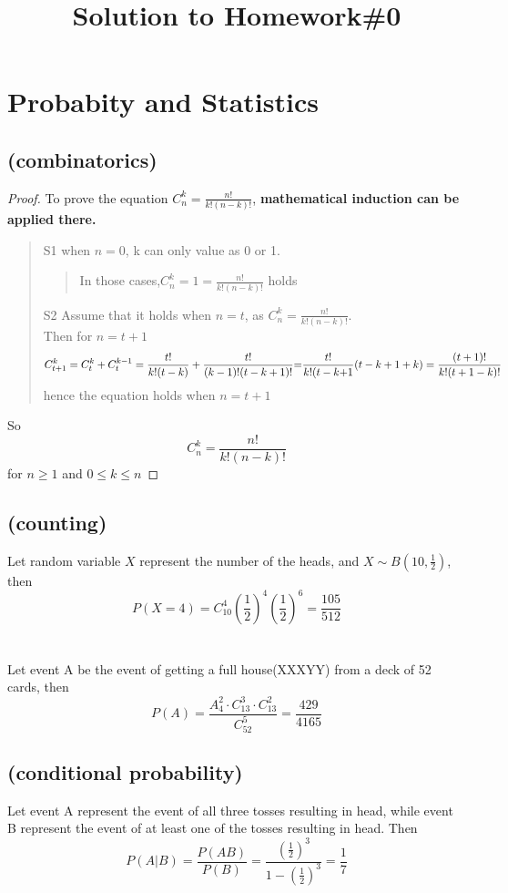 \documentclass[a4paper]{exam}
\title{Solution to Homework\#0}
\date{}
\begin{document}
	\section{Probabity and Statistics}
	  \subsection{(combinatorics)}
	  \begin{proof}
	  To prove the equation  $C_n^k = \frac{{n!}}{{k!(n - k)!}}$, \textbf{mathematical induction can be applied there.}
	     \begin{quote}  
	      S1 when $n=0$, k can only value as 0 or 1.  
	        \begin{quote}
	     	In those cases,$C_n^k = 1 = \frac{{n!}}{{k!(n - k)!}}$ holds
	        \end{quote}
	      S2 Assume that it holds when $n=t$, as $C_n^k = \frac{{n!}}{{k!(n - k)!}}$. \\
          Then for $n=t+1$\\
           \[C_{t + 1}^k = C_t^k + C_t^{k - 1} = \frac{{t!}}{{k!(t - k)}} + \frac{{t!}}{{(k - 1)!(t - k + 1)!}}{\rm{ = }}\frac{{t!}}{{k!(t - k{\rm{ + }}1}}(t - k + 1 + k) = \frac{{(t + 1)!}}{{k!(t + 1 - k)!}}\]
           hence the equation holds when $n=t+1$  
        \end{quote}
     So\\ 
     \[C_n^k = \frac{{n!}}{{k!(n - k)!}}\]for $n \ge 1$ and $0 \le k \le n$     
      \end{proof}
	  \subsection{(counting)}
	   Let random variable $X$ represent the number of the heads, and $X\sim B(10,\frac{1}{2})$, then 
       \[P(X = 4) = C_{10}^4{(\frac{1}{2})^4}{(\frac{1}{2})^6} = \frac{{105}}{{512}}\]
       \\ \\
       \indent Let event A be the event of getting a full house(XXXYY) from a deck of 52 cards, then
       \[P(A) = \frac{{A_4^2 \cdot C_{13}^3 \cdot C_{13}^2}}{{C_{52}^5}} = \frac{{429}}{{4165}}\]

	  \subsection{(conditional probability)}
	  Let event A represent the event of all three tosses resulting in head, while event B represent the event of at least one of the tosses resulting in head. Then
      \[P(A|B) = \frac{{P(AB)}}{{P(B)}} = \frac{{{{(\frac{1}{2})}^3}}}{{1 - {{(\frac{1}{2})}^3}}} = \frac{1}{7}\]
	  
\end{document}
